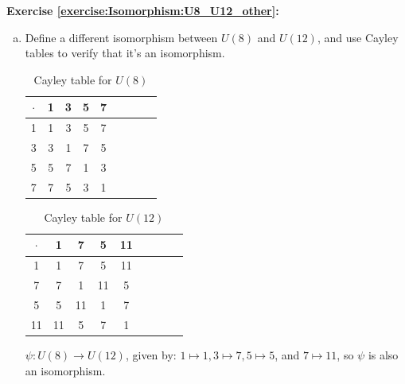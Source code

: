 \noindent\textbf{Exercise \ref{exercise:Isomorphism:U8_U12_other}:}
\begin{enumerate}[(a)]

\item
Define a different isomorphism between $U(8)$ and $U(12)$, and use Cayley tables to verify that it's an isomorphism. 
\begin{multicols}{2}
\begin{table}[H]
\caption{Cayley table for $U(8)$}
{\small
\begin{center}
\begin{tabular}{c|cccccccc}
$\cdot$ & 1 & 3 & 5 & 7  \\
\hline
1        & 1 & 3 & 5 & 7  \\
3       & 3 & 1 & 7 & 5  \\
5       & 5 & 7 & 1 & 3 \\
7       & 7 & 5 & 3 & 1 \\
\end{tabular}
\end{center}
}
\end{table}

\begin{table}[H]
\caption{Cayley table for $U(12)$}
{\small
\begin{center}
\begin{tabular}{c|cccccccc}
$\cdot$ & 1 & 7 & 5 & 11  \\
\hline
1        & 1 & 7 & 5 & 11  \\
7       & 7 & 1 & 11 & 5 \\
5       & 5 & 11 & 1 & 7  \\
11      & 11 & 5 & 7 & 1 \\
\end{tabular}
\end{center}
}
\end{table}
\end{multicols}
$\psi : U(8) \rightarrow U(12)$, given by: $1\mapsto 1, 3 \mapsto 7, 5 \mapsto 5$, and $7 \mapsto 11$, so $\psi$ is also an isomorphism.
\end{enumerate}

